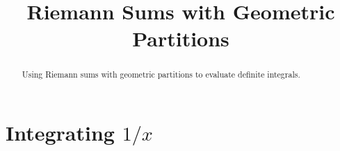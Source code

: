 \documentclass{ximera}
\title{Riemann Sums with Geometric Partitions}
\begin{document}
\begin{abstract}
Using Riemann sums with geometric partitions to evaluate definite integrals.
\end{abstract}
\maketitle



\section{Integrating $1/x$}




\begin{onlineOnly}
    \begin{center}
\end{center}
\end{onlineOnly}
\end{document}
